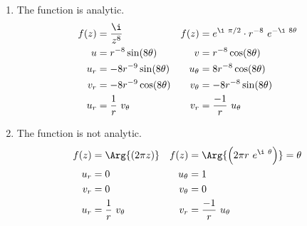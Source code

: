 \begin{enumerate}
    \item The function is \textcolor{y_h}{analytic}.
          \begin{align}
              f(z)     & = \frac{\i}{z^8}                               &
              f(z)     & = e^{\i\ \pi/2} \cdot r^{-8}\ e^{-\i\ 8\theta}   \\
              u        & = r^{-8} \sin(8\theta)                         &
              v        & = r^{-8} \cos(8\theta)                           \\
              u_r      & = -8r^{-9} \sin(8\theta)                       &
              u_\theta & = 8r^{-8} \cos(8\theta)                          \\
              v_r      & = -8r^{-9} \cos(8\theta)                       &
              v_\theta & = -8r^{-8} \sin(8\theta)                         \\
              u_r      & = \frac{1}{r}\ v_\theta                        &
              v_r      & = \frac{-1}{r}\ u_\theta
          \end{align}

    \item The function is \textcolor{y_p}{not analytic}.
          \begin{align}
              f(z)     & = \Arg{(2\pi z)}                                  &
              f(z)     & = \Arg{\Big(2\pi r\ e^{\i\ \theta}\Big)} = \theta   \\
              u_r      & = 0                                               &
              u_\theta & = 1                                                 \\
              v_r      & = 0                                               &
              v_\theta & = 0                                                 \\
              u_r      & = \frac{1}{r}\ v_\theta                           &
              v_r      & = \frac{-1}{r}\ u_\theta
          \end{align}


\end{enumerate}
